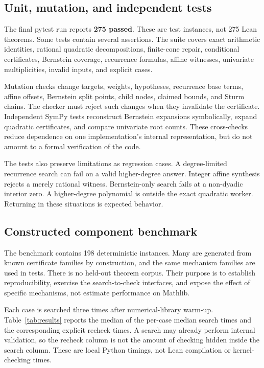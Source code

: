 \subsection{Unit, mutation, and independent tests}

The final pytest run reports \textbf{275 passed}. These are test instances, not 275 Lean theorems. Some tests contain several assertions. The suite covers exact arithmetic identities, rational quadratic decompositions, finite-cone repair, conditional certificates, Bernstein coverage, recurrence formulas, affine witnesses, univariate multiplicities, invalid inputs, and explicit \unknown{} cases.

Mutation checks change targets, weights, hypotheses, recurrence base terms, affine offsets, Bernstein split points, child nodes, claimed bounds, and Sturm chains. The checker must reject such changes when they invalidate the certificate. Independent SymPy tests reconstruct Bernstein expansions symbolically, expand quadratic certificates, and compare univariate root counts. These cross-checks reduce dependence on one implementation's internal representation, but do not amount to a formal verification of the code.

The tests also preserve limitations as regression cases. A degree-limited recurrence search can fail on a valid higher-degree answer. Integer affine synthesis rejects a merely rational witness. Bernstein-only search fails at a non-dyadic interior zero. A higher-degree polynomial is outside the exact quadratic worker. Returning \unknown{} in these situations is expected behavior.

\subsection{Constructed component benchmark}

The benchmark contains 198 deterministic instances. Many are generated from known certificate families by construction, and the same mechanism families are used in tests. There is no held-out theorem corpus. Their purpose is to establish reproducibility, exercise the search-to-check interfaces, and expose the effect of specific mechanisms, not estimate performance on Mathlib.

Each case is searched three times after numerical-library warm-up. Table~\ref{tab:results} reports the median of the per-case median search times and the corresponding explicit recheck times. A search may already perform internal validation, so the recheck column is not the amount of checking hidden inside the search column. These are local Python timings, not Lean compilation or kernel-checking times.

